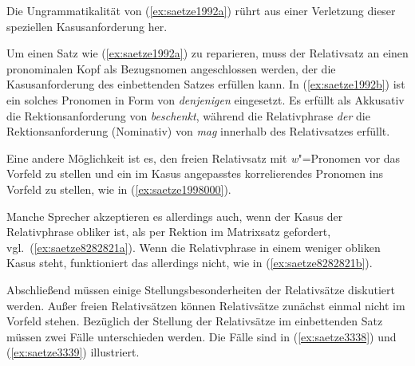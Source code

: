 Die Ungrammatikalität von (\ref{ex:saetze1992a}) rührt aus einer Verletzung dieser speziellen Kasusanforderung her.

\begin{exe}
\end{exe}

Um einen Satz wie (\ref{ex:saetze1992a}) zu reparieren, muss der Relativsatz an einen pronominalen Kopf als Bezugsnomen angeschlossen werden, der die Kasusanforderung des einbettenden Satzes erfüllen kann.
In (\ref{ex:saetze1992b}) ist ein solches Pronomen in Form von \textit{denjenigen} eingesetzt.
Es erfüllt als Akkusativ die Rektionsanforderung von \textit{beschenkt}, während die Relativphrase \textit{der} die Rektionsanforderung (Nominativ) von \textit{mag} innerhalb des Relativsatzes erfüllt.

\begin{exe}
\end{exe}

Eine andere Möglichkeit ist es, den freien Relativsatz mit \textit{w}"=Pronomen vor das Vorfeld zu stellen und ein im Kasus angepasstes korrelierendes Pronomen ins Vorfeld zu stellen, wie in (\ref{ex:saetze1998000}).

\begin{exe}
\end{exe}

Manche Sprecher akzeptieren es allerdings auch, wenn der Kasus der Relativphrase obliker ist, als per Rektion im Matrixsatz gefordert, vgl.\ (\ref{ex:saetze8282821a}).
Wenn die Relativphrase in einem weniger obliken Kasus steht, funktioniert das allerdings nicht, wie in (\ref{ex:saetze8282821b}).

\begin{exe}
  \ex\label{ex:saetze8282821} 
  \begin{xlist}
  \end{xlist}
\end{exe}

Abschließend müssen einige Stellungsbesonderheiten der Relativsätze diskutiert werden. 
Außer freien Relativsätzen können Relativsätze zunächst einmal nicht im Vorfeld stehen.
Bezüglich der Stellung der Relativsätze im einbettenden Satz müssen zwei Fälle unterschieden werden.
Die Fälle sind in (\ref{ex:saetze3338}) und (\ref{ex:saetze3339}) illustriert.

